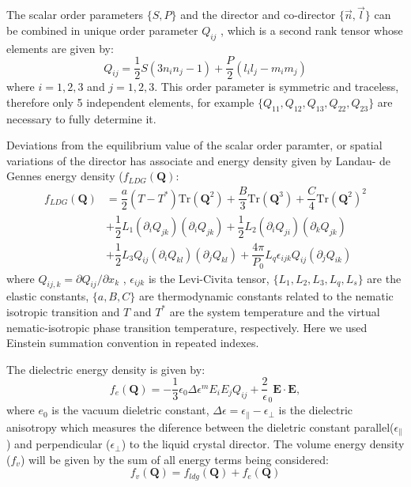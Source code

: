 \documentclass[final,5p,times,twocolumn]{elsarticle}
\begin{document}
The scalar order parameters $\lbrace S, P \rbrace$ and the director and co-director $\lbrace \vec{n}, \vec{l} \rbrace$ can be
combined in unique order parameter $Q_{ij}$ , which is a second rank tensor whose elements are given by:
\begin{equation}\label{eq:tensorial_parameter}
  Q_{ij}=\dfrac{1}{2} S ( 3 n_{i} n_{j}- 1) + \dfrac{P}{2} (l_i l_j - m_i m_j)
\end{equation}
where $i=1,2,3$ and $j=1,2,3$.  This order parameter is symmetric and traceless, therefore only 5 independent elements, for example $\lbrace Q_{11}, Q_{12},Q_{13}, Q_{22}, Q_{23} \rbrace $ are necessary to fully determine it.

Deviations from the equilibrium value of the scalar order paramter, or
spatial variations of the director has associate and energy density
given by Landau- de Gennes energy density ($f_{LDG}(\mathbf{Q})$:
\begin{align}\label{eq:Landau_deGennes} \nonumber
  f_{LDG}(\mathbf{Q})&=\dfrac{a}{2}(T-T^*) \text{Tr}(\mathbf{Q}^2) +
                       \dfrac{B}{3} \text{Tr}(\mathbf{Q}^3)
                       +  \dfrac{C}{4} \text{Tr}(\mathbf{Q}^2)^2 \\ \nonumber
                     &+ \dfrac{1}{2} L_1 \left( \partial_i Q_{jk} \right)
                       \left( \partial_i Q_{jk} \right) + \dfrac{1}{2} L_2
                       \left( \partial_i Q_{ji} \right) \left( \partial_k Q_{jk} \right) \\
                     &+\dfrac{1}{2} L_3 Q_{ij}\left( \partial_i Q_{kl}\right) \left(\partial_j Q_{kl}\right)  + \dfrac{4 \pi}{P_0} L_q \epsilon_{ijk} Q_{ij}\left( \partial_j Q_{ik} \right)                     
\end{align}
%
where $Q_{ij,k}= \partial Q_{ij}/\partial x_k$ , $\epsilon_{ijk}$ is
the Levi-Civita tensor, $\lbrace L_1 ,L_2,L_3, L_q, L_s \rbrace$ are
the elastic constants, $\lbrace a,B,C \rbrace$ are thermodynamic
constants related to the nematic isotropic transition and $T$ and
$T^*$ are the system temperature and the virtual nematic-isotropic
phase transition temperature, respectively. Here we used Einstein
summation convention in repeated indexes.

The dielectric energy density is given by:
\begin{equation}
 f_e(\mathbf{Q})= -\dfrac{1}{3} \epsilon_0 \Delta \epsilon^m E_i E_j Q_{ij}+ \dfrac{2} \epsilon_0 \mathbf{E} \cdot \mathbf{E},
\end{equation}
where $e_0$ is the vacuum dieletric constant,
$\Delta \epsilon=\epsilon_{\parallel} - \epsilon_{\perp}$ is the
dielectric anisotropy which measures the diference between the
dieletric constant parallel($\epsilon_{\parallel}$) and perpendicular
($\epsilon_{\perp}$) to the liquid crystal director.  The volume energy
density ($f_v$) will be given by the sum of all energy terms being considered:
\begin{equation}
  f_v(\mathbf{Q})=f_{ldg}(\mathbf{Q})+f_e(\mathbf{Q})
\end{equation}
\end{document}
